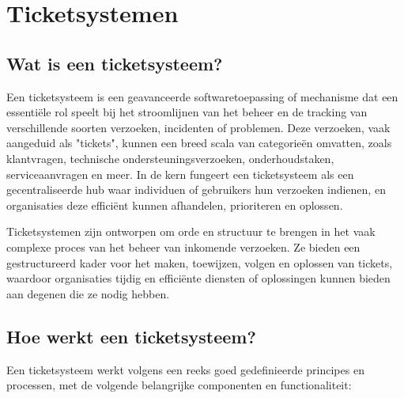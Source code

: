 
\section{Ticketsystemen}

\subsection{Wat is een ticketsysteem?}
 Een ticketsysteem is een geavanceerde softwaretoepassing of mechanisme dat een essentiële rol speelt bij het stroomlijnen van het beheer en de tracking van verschillende soorten verzoeken, incidenten of problemen. Deze verzoeken, vaak aangeduid als "tickets", kunnen een breed scala van categorieën omvatten, zoals klantvragen, technische ondersteuningsverzoeken, onderhoudstaken, serviceaanvragen en meer. In de kern fungeert een ticketsysteem als een gecentraliseerde hub waar individuen of gebruikers hun verzoeken indienen, en organisaties deze efficiënt kunnen afhandelen, prioriteren en oplossen.

Ticketsystemen zijn ontworpen om orde en structuur te brengen in het vaak complexe proces van het beheer van inkomende verzoeken. Ze bieden een gestructureerd kader voor het maken, toewijzen, volgen en oplossen van tickets, waardoor organisaties tijdig en efficiënte diensten of oplossingen kunnen bieden aan degenen die ze nodig hebben.

\subsection{Hoe werkt een ticketsysteem?}
 Een ticketsysteem werkt volgens een reeks goed gedefinieerde principes en processen, met de volgende belangrijke componenten en functionaliteit:
 
